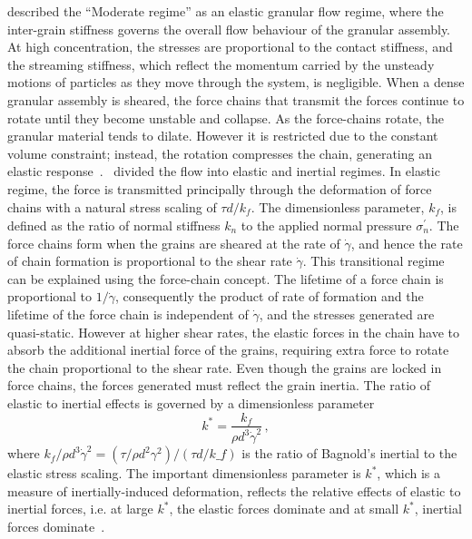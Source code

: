 \citet{Campbell2002} described the ``Moderate regime'' as an elastic granular 
flow regime, where the inter-grain stiffness governs the overall flow 
behaviour of the granular assembly. At high concentration, the stresses are 
proportional to the contact stiffness, and the streaming stiffness, which  
reflect the momentum carried by the unsteady motions of particles as they
move through the system, is negligible. When a dense granular assembly is 
sheared, the force chains that transmit the forces continue to rotate until 
they become unstable and collapse. As the force-chains rotate, the granular 
material tends to dilate. However it is restricted due to the constant volume
 constraint; instead, the rotation 
compresses the chain, generating an elastic 
response~\citep{Campbell2006}.~\citet{Campbell2002} divided the flow into 
elastic and inertial regimes. In elastic regime, the force is 
transmitted principally through the deformation of force chains with a natural 
stress scaling of $\tau \mathit{d}/\mathit{k_f}$. The dimensionless parameter, 
$\mathit{k_f}$, is defined as the ratio of normal stiffness $k_n$ to 
the applied normal pressure $\sigma_n^\prime$. The force 
chains form when the grains are sheared at the rate of $\dot{\gamma}$, and 
hence the rate of chain formation is proportional to the shear rate 
$\dot{\gamma}$. This transitional regime can be explained using the force-chain 
concept. The lifetime of a force chain is proportional to $1/\dot{\gamma}$, 
consequently the 
product of rate of formation and the lifetime of the force chain is independent 
of $\dot{\gamma}$, and the stresses generated are quasi-static. However at 
higher shear rates, the elastic forces in the chain have to absorb the 
additional inertial force of the grains, requiring extra force to rotate the 
chain proportional to the shear rate. Even though the grains are locked in 
force chains, the forces generated must reflect the grain inertia. The ratio of 
elastic to inertial effects is governed by a dimensionless parameter
%
\begin{equation}
\textit{k}^{*} = \frac{k_f}{\rho \textit{d}^{3} \dot{\gamma}^{2}} \,,
\end{equation}
%
where ${k_f}/{\rho \textit{d}^{3} \dot{\gamma}^{2}}=({\tau}/{\rho 
\textit{d}^{2} 
{\gamma}^{2}})/(\tau\textit{d}/\textit{k_f})$ is the ratio of Bagnold's 
inertial 
to the elastic stress scaling. The important dimensionless parameter is 
$\textit{k}^{*}$, which is a measure of inertially-induced deformation, 
reflects the relative effects of elastic to inertial forces, i.e. at large 
$\textit{k}^{*}$, the elastic forces dominate and at small $\textit{k}^{*}$, 
inertial forces dominate~\citep{Campbell2006}.

